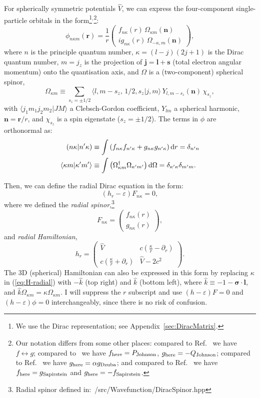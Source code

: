 \documentclass[10pt,twocolumn,a4paper]{article}%
\newcommand{\braket}[1]{\ensuremath{\langle #1\rangle}}	%
\newcommand{\matr}[4]{\ensuremath{\begin{pmatrix}#1&#2\\#3&#4\end{pmatrix}}}	%
\newcommand{\twocomp}[2]{\ensuremath{\begin{pmatrix}#1\\#2\end{pmatrix}}}	%
\renewcommand{\v}[1]{\ensuremath{\boldsymbol{#1}}}		%
\newcommand{\be}{\begin{equation}}
\newcommand{\ee}{\end{equation}}
\def\d{\ensuremath{{\rm d}}}
\def\en{\ensuremath{\varepsilon}}
\def\p{\ensuremath{\partial}}
\newcommand{\s}{\ensuremath{\sigma}}
\renewcommand{\k}{\ensuremath{\kappa}}
\begin{document}
For spherically symmetric potentials $\hat V$, we can express the four-component single-particle orbitals in the form\footnote{We use the Dirac representation; see Appendix~\ref{sec:DiracMatrix}.}$^,$\footnote{Our notation differs from some other places: compared to Ref.~\cite{BetheBook} we have $f\leftrightarrow g$;
compared to~\cite{JohnsonBook2007} we have $f_{\rm here}= P_{\rm Johnson}$, $g_{\rm here}= -Q_{\rm Johnson}$; compared to Ref.~\cite{Dzuba1982a} we have $g_{\rm here} = \alpha g_{\rm Dzuba}$; and compared to Ref.~\cite{Sapirstein1998} we have $f_{\rm here} = g_{\rm Sapirstein}$ and $g_{\rm here}=-f_{\rm Sapirstein}$.}:
\be\label{eq:phi-orbital}
\phi_{n\k m}(\v{r}) = \frac{1}{r}\twocomp
{f_{n\k}(r)\,\Omega_{\k m}(\v{n})}
{ig_{n\k}(r)\,\Omega_{-\k ,m}(\v{n})},
\ee
where $n$ is the principle quantum number, $\k = (l-j)(2j+1)$ is the Dirac quantum number, $m=j_z$ is the projection of $\v{j}=\v{l}+\v{s}$ (total electron angular momentum) onto the quantisation axis,
and $\Omega$ is a (two-component) spherical spinor,
\be
\Omega_{\k m} \equiv \sum_{s_z=\pm1/2} \braket{l,m-s_z ,\,1/2,s_z|j,m}\,Y_{l,m-s_z}(\v{n})\,\chi_{s_z},
\ee
with $\braket{j_1 m_1 j_2 m_2|JM}$ a Clebsch-Gordon coefficient, $Y_{lm}$ a spherical harmonic, $\v{n} = \v{r}/r$, and $\chi_{s_z}$ is a spin eigenstate 
($s_z=\pm1/2$).
The terms in $\phi$ are orthonormal as: 
\begin{align}\label{eq:ffrad}
\left(n\k|n'\k\right)&\equiv\int\left(f_{n\k}f_{n'\k}+g_{n\k}g_{n'\k}\right)\d r = \delta_{n'n}\\
\braket{\k m|\k'm'}&\equiv\int\left(\Omega_{\k m}^\dag\Omega_{\k' m'}\right)\d \Omega = \delta_{\k'\k}\delta_{m'm}.
\end{align}


Then, we can define the radial Dirac equation in the form: 
\be\label{eq:Dirac-radial}
\left(h_r - \en\right)F_{n\k} = 0,
\ee
where we defined the {\em radial spinor},\footnote{Radial spinor defined in:~/src/Wavefunction/DiracSpinor.hpp}
\be\label{eq:F-radial}
F_{n\k} =\twocomp {f_{n\k}(r)}{g_{n\k}(r)},
\ee
and {\em radial Hamiltonian},
\be\label{eq:H-radial}
h_r = \matr 	{\hat V} 				{c(\frac{\k}{r}-\p_r )}
			{c(\frac{\k}{r} + \p_r  )}	{\hat V-2c^2}.
\ee
The 3D (spherical) Hamiltonian can also be expressed in this form by replacing $\k$ in (\ref{eq:H-radial}) with $-\hat k$ (top right) and $\hat k$ (bottom left), where $\hat k \equiv -1 - \v{\s}\cdot\v{l}$,  and $\hat k\Omega_{\k m} = \k\Omega_{\k m}$.
I will suppress the $r$ subscript and use
$\left(h - \en\right)F = 0$ and $\left(h - \en\right)\phi = 0$ interchangeably, since there is no risk of confusion.\\
\end{document}
